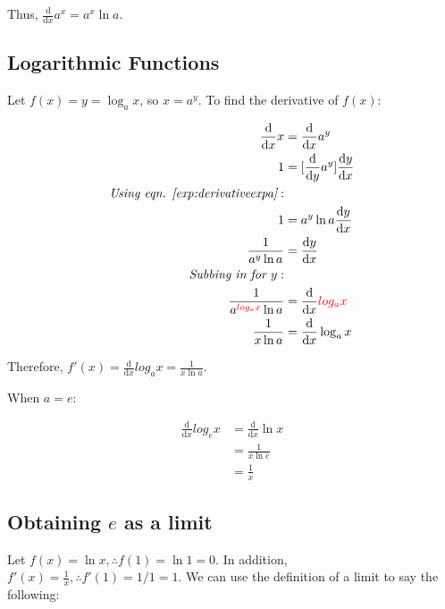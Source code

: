 \documentclass[12pt]{article}
\begin{document}
Thus, $\frac{\text{d}}{\text{d}x} a^x = a^x \ln a$.

\subsection{Logarithmic Functions}

Let $f(x) = y = \log_a{x}$, so $x = a^y$. To find the derivative of $f(x)$:

\begin{equation}
    \begin{split}
        \frac{\text{d}}{\text{d}x} x &= \frac{\text{d}}{\text{d}x} a^y\\
        1 &= [\frac{\text{d}}{\text{d}y} a^y] \frac{\text{d}y}{\text{d}x}\\
        \textit{Using eqn. \ref{exp:derivativeexpa}}:\\
        1 &= a^y \ln a \frac{\text{d}y}{\text{d}x}\\
        \frac{1}{a^y \ln a} &= \frac{\text{d}y}{\text{d}x}\\
        \textit{Subbing in for $y$}:\\
        \frac{1}{a^{\textcolor{red}{log_a{x}}} \ln a} &= \frac{\text{d}}{\text{d}x} \textcolor{red}{log_a{x}}\\
        \frac{1}{x \ln a} &= \frac{\text{d}}{\text{d}x} \log_a{x}
    \end{split}
\end{equation}

Therefore, $f'(x) = \frac{\text{d}}{\text{d}x} log_a{x} = \frac{1}{x \ln a}$.

When $a = e$:

\begin{equation}
    \begin{split}
        \frac{\text{d}}{\text{d}x} log_e{x} &= \frac{\text{d}}{\text{d}x} \ln x\\
        &= \frac{1}{x \ln e} \\
        &= \frac{1}{x}
    \end{split}
\end{equation}

\subsection{Obtaining \texorpdfstring{$e$}{Euler's number} as a limit}

Let $f(x) = \ln x, \therefore f(1) = \ln 1 = 0$. In addition, $f'(x) = \frac{1}{x}, \therefore f'(1) = 1/1 = 1$. We can use the definition of a limit to say the following:
\end{document}
